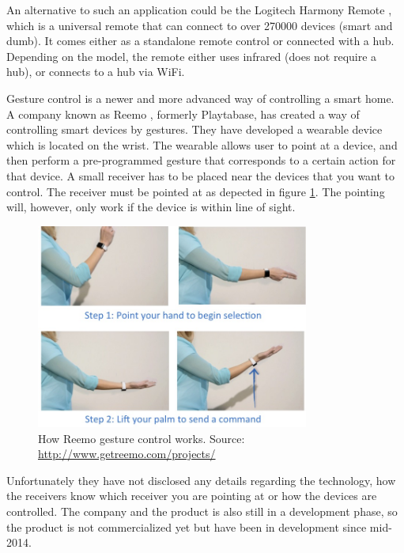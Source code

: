 An alternative to such an application could be the Logitech Harmony Remote \cite{HARMONYREMOTE}, 
which is a universal remote that can connect to over \num{270000} devices (smart and dumb). 
It comes either as a standalone remote control or connected with a hub. 
Depending on the model, the remote either uses infrared (does not require a hub), 
or connects to a hub via WiFi. 

Gesture control is a newer and more advanced way of controlling a smart home. 
A company known as Reemo \cite{Reemo}, formerly Playtabase, has created a way of controlling smart devices by gestures. 
They have developed a wearable device which is located on the wrist. The wearable allows user to point at a device, 
and then perform a pre-programmed gesture that corresponds to a certain action for that device. 
A small receiver has to be placed near the devices that you want to control. The receiver must be pointed at as depected in figure \ref{fig:reemo}.
The pointing will, however, only work if the device is within line of sight. 

\begin{figure}[!htb]
    \centering
    \includegraphics[width=0.8\textwidth]{images/Reemo}
    \caption{How Reemo gesture control works. Source: \url{http://www.getreemo.com/projects/}}
    \label{fig:reemo}
\end{figure}

Unfortunately they have not disclosed any details regarding the technology, 
how the receivers know which receiver you are pointing at or how the devices are controlled. 
The company and the product is also still in a development phase, 
so the product is not commercialized yet but have been in development since mid-2014.

